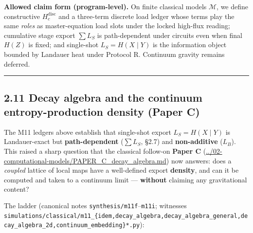 \documentclass[
  11pt,
]{article}
\begin{document}
\textbf{Allowed claim form (program-level).} On finite classical models
\(\mathcal{M}\), we define constructive \(H_c^{\mathrm{disc}}\) and a
three-term discrete load ledger whose terms play the same \emph{roles}
as master-equation load slots under the locked high-flux reading;
cumulative stage export \(\sum L_S\) is path-dependent under circuits
even when final \(H(Z)\) is fixed; and single-shot \(L_S=H(X\mid Y)\) is
the information object bounded by Landauer heat under Protocol R.
Continuum gravity remains deferred.

\begin{center}\rule{0.5\linewidth}{0.5pt}\end{center}

\subsection{2.11 Decay algebra and the continuum entropy-production
density (Paper
C)}\label{decay-algebra-and-the-continuum-entropy-production-density-paper-c}

The M11 ledgers above establish that single-shot export
\(L_S=H(X\mid Y)\) is Landauer-exact but \textbf{path-dependent}
(\(\sum L_S\), §2.7) and \textbf{non-additive} (\(L_B\)). This raised a
sharp question that the classical follow-on \textbf{Paper C}
(\url{../02-computational-models/PAPER_C_decay_algebra.md}) now answers:
does a \emph{coupled} lattice of local maps have a well-defined export
\textbf{density}, and can it be computed and taken to a continuum limit
--- \textbf{without} claiming any gravitational content?

The ladder (canonical notes \texttt{synthesis/m11f}--\texttt{m11i};
witnesses
\texttt{simulations/classical/m11\_\{idem,decay\_algebra,decay\_algebra\_general,decay\_algebra\_2d,continuum\_embedding\}*.py}):
\end{document}

